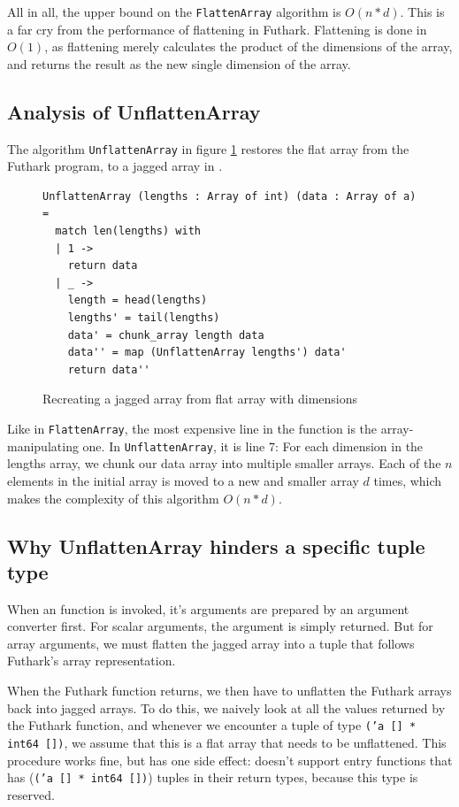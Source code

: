 All in all, the upper bound on the \texttt{FlattenArray} algorithm is $O(n*d)$.
This is a far cry from the performance of flattening in Futhark. Flattening is
done in $O(1)$, as flattening merely calculates the product of the dimensions of
the array, and returns the result as the new single dimension of the array.

\subsection{Analysis of UnflattenArray}
The algorithm \texttt{UnflattenArray} in figure \ref{fig:unflattenarray}
restores the flat array from the Futhark \csharp{} program, to a jagged array in \fsharp{}.

\begin{figure}[H]
  \centering
\begin{verbatim}
UnflattenArray (lengths : Array of int) (data : Array of a) =
  match len(lengths) with
  | 1 ->
    return data
  | _ ->
    length = head(lengths)
    lengths' = tail(lengths)
    data' = chunk_array length data 
    data'' = map (UnflattenArray lengths') data'
    return data''
\end{verbatim}
  \caption{Recreating a jagged array from flat array with dimensions}
  \label{fig:unflattenarray}
\end{figure}

Like in \texttt{FlattenArray}, the most expensive line in the function is the
array-manipulating one. In \texttt{UnflattenArray}, it is line 7: For each
dimension in the lengths array, we chunk our data array into multiple smaller
arrays. Each of the $n$ elements in the initial array is moved to a new and smaller array
$d$ times, which makes the complexity of this algorithm $O(n*d)$.

\subsection{Why UnflattenArray hinders a specific tuple type}
\label{subsec:hinderedtupletype}

When an \fshark{} function is invoked, it's arguments are prepared by an
argument converter first. For scalar arguments, the argument is simply returned.
But for array arguments, we must flatten the jagged array into a tuple that
follows Futhark's array representation.

When the Futhark function returns, we then have to unflatten the Futhark arrays
back into jagged arrays. To do this, we naively look at all the values
returned by the Futhark function, and whenever we encounter a tuple of type
\texttt{('a [] * int64 [])}, we assume that this is a flat array that needs to
be unflattened.
This procedure works fine, but has one side effect: \fshark{} doesn't support
entry functions that has (\texttt{('a [] * int64 [])}) tuples in their return
types, because this type is reserved.

